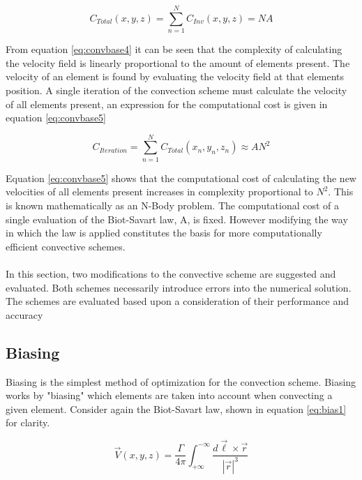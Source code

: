 \begin{equation}
\label{eq:convbase4}
C_{Total}(x,y,z)=\sum_{n=1}^{N} C_{Inv}(x,y,z)=NA
\end{equation}

From equation \ref{eq:convbase4} it can be seen that the complexity of calculating the velocity field is linearly proportional to the amount of elements present. The velocity of an element is found by evaluating the velocity field at that elements position. A single iteration of the convection scheme must calculate the velocity of all elements present, an expression for the computational cost is given in equation \ref{eq:convbase5}

\begin{equation}
\label{eq:convbase5}
C_{Iteration}=\sum_{n=1}^{N} C_{Total}(x_n,y_n,z_n)\approx AN^2
\end{equation}

Equation \ref{eq:convbase5} shows that the computational cost of calculating the new velocities of all elements present increases in complexity proportional to $N^2$. This is known mathematically as an N-Body problem. The computational cost of a single evaluation of the Biot-Savart law, A, is fixed. However modifying the way in which the law is applied constitutes the basis for more computationally efficient convective schemes.
\\\\
In this section, two modifications to the convective scheme are suggested and evaluated. Both schemes necessarily introduce errors into the numerical solution. The schemes are evaluated based upon a consideration of their performance and accuracy

\subsection{Biasing}
Biasing is the simplest method of optimization for the convection scheme. Biasing works by "biasing" which elements are taken into account when convecting a given element. Consider again the Biot-Savart law, shown in equation \ref{eq:bias1} for clarity.

\begin{equation}
\label{eq:bias1}
\vec{V}(x,y,z)=\frac{\Gamma}{4\pi}\int_{+\infty}^{-\infty} \frac{d\vec{\ell}\times\vec{r}}{|\vec{r}|^3}
\end{equation}

